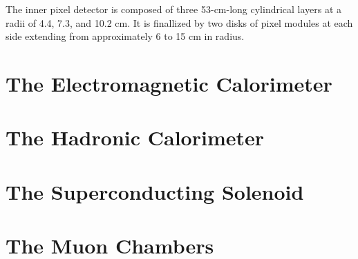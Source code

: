The inner pixel detector is composed of three 53-cm-long cylindrical layers at a
radii of 4.4, 7.3, and 10.2 cm. It is finallized by two disks of pixel
modules at each side extending from approximately 6 to 15 cm in radius.

\section{The Electromagnetic Calorimeter}
\section{The Hadronic Calorimeter}
\section{The Superconducting Solenoid}
\section{The Muon Chambers}